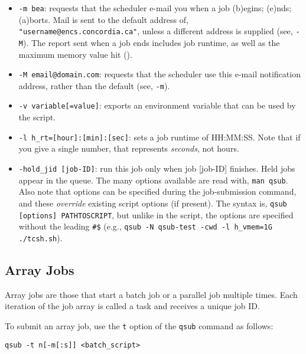 \documentclass{easychair}
\begin{document}
\begin{itemize}
\item
\texttt{-m bea}: requests that the scheduler e-mail you when a job (b)egins;
(e)nds; (a)borts. Mail is sent to the default address of,
\texttt{"username@encs.concordia.ca"}, unless a different address is supplied (see, 
\texttt{-M}). The report sent when a job ends includes job 
runtime, as well as the maximum memory value hit (). 

\item
\texttt{-M email@domain.com}: requests that the scheduler use this e-mail 
notification address, rather than the default (see, \texttt{-m}). 

\item
\texttt{-v variable[=value]}: exports an environment variable that can be used by the script.

\item
\texttt{-l h\_rt=[hour]:[min]:[sec]}: sets a job runtime of HH:MM:SS. Note 
that if you give a single number, that represents \emph{seconds}, not hours. 

\item
\texttt{-hold\_jid [job-ID]}: run this job only when job [job-ID] finishes. Held jobs appear in the queue. 
The many  options available are read with, \texttt{man qsub}. Also 
note that  options can be specified during the job-submission 
command, and these \emph{override} existing script options (if present). The 
syntax is, \texttt{qsub [options] PATHTOSCRIPT}, but unlike in the script, 
the options are specified without the leading \verb+#$+
(e.g., \texttt{qsub -N qsub-test -cwd -l h\_vmem=1G ./tcsh.sh}). 

\end{itemize}

\subsection{Array Jobs}

Array jobs are those that start a batch job or a parallel job multiple times. 
Each iteration of the job array is called a task and receives a unique job ID.

To submit an array job, use the \texttt{\-t} option of the \texttt{qsub} 
command as follows:

\begin{verbatim}
qsub -t n[-m[:s]] <batch_script>
\end{verbatim}
\end{document}
